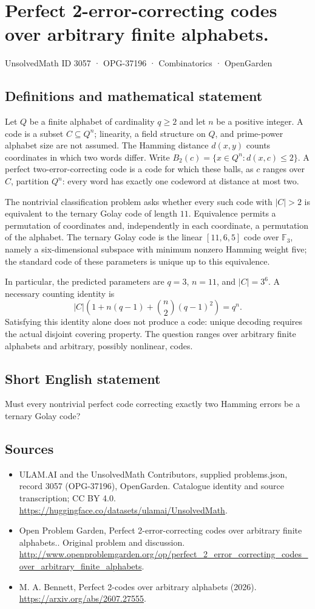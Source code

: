\documentclass[11pt,a4paper]{article}
\begin{document}
\section*{Perfect 2-error-correcting codes over arbitrary finite alphabets.}\label{3057}
{\small UnsolvedMath ID 3057 · OPG-37196 · Combinatorics · OpenGarden}
\subsection{Definitions and mathematical statement}
Let $Q$ be a finite alphabet of cardinality $q\ge2$ and let $n$ be a positive integer. A code is a subset $C\subseteq Q^n$; linearity, a field structure on $Q$, and prime-power alphabet size are not assumed. The Hamming distance $d(x,y)$ counts coordinates in which two words differ. Write $B_2(c)=\{x\in Q^n:d(x,c)\le2\}$. A perfect two-error-correcting code is a code for which these balls, as $c$ ranges over $C$, partition $Q^n$: every word has exactly one codeword at distance at most two.

The nontrivial classification problem asks whether every such code with $|C|>2$ is equivalent to the ternary Golay code of length $11$. Equivalence permits a permutation of coordinates and, independently in each coordinate, a permutation of the alphabet. The ternary Golay code is the linear $[11,6,5]$ code over $\mathbb F_3$, namely a six-dimensional subspace with minimum nonzero Hamming weight five; the standard code of these parameters is unique up to this equivalence.

In particular, the predicted parameters are $q=3$, $n=11$, and $|C|=3^6$. A necessary counting identity is
\[
 |C|\left(1+n(q-1)+\binom n2(q-1)^2\right)=q^n.
\]
Satisfying this identity alone does not produce a code: unique decoding requires the actual disjoint covering property. The question ranges over arbitrary finite alphabets and arbitrary, possibly nonlinear, codes.
\subsection{Short English statement}
Must every nontrivial perfect code correcting exactly two Hamming errors be a ternary Golay code?
\subsection{Sources}
\begin{itemize}
\item[S1] ULAM.AI and the UnsolvedMath Contributors, supplied problems.json, record 3057 (OPG-37196), OpenGarden. Catalogue identity and source transcription; CC BY 4.0.
\url{https://huggingface.co/datasets/ulamai/UnsolvedMath}.
\item[S2] Open Problem Garden, Perfect 2-error-correcting codes over arbitrary finite alphabets.. Original problem and discussion.
\url{http://www.openproblemgarden.org/op/perfect_2_error_correcting_codes_over_arbitrary_finite_alphabets}.
\item[S3] M. A. Bennett, Perfect 2-codes over arbitrary alphabets (2026).
\url{https://arxiv.org/abs/2607.27555}.
\end{itemize}
\end{document}
